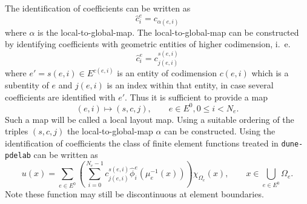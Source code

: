 The identification of coefficients can be written as
\begin{equation}
\hat{c}_i^e = c_{\alpha(e,i)}
\end{equation}
where $\alpha$ is the local-to-global-map.
The local-to-global-map can be constructed by identifying coefficients
with geometric entities of higher codimension, i.~e.
\begin{equation}
\hat{c}_i^e = c_{j(e,i)}^{s(e,i)}
\end{equation}
where $e'=s(e,i)\in E^{c(e,i)}$ is an entity of codimension $c(e,i)$
which is a subentity of $e$ and
$j(e,i)$ is an index within that entity, in case several
coefficients are identified with $e'$. Thus it is sufficient to
provide a map 
\begin{equation}
(e,i) \mapsto (s,c,j), \qquad e\in E^0, 0\leq i < N_e.
\end{equation}
Such a map will be called a local layout map. Using a suitable
ordering of the triples $(s,c,j)$ the local-to-global-map $\alpha$ can
be constructed. Using the identification of coefficients the class of
finite element functions treated in \texttt{dune-pdelab} can be
written as
\begin{equation}
u(x) = \sum_{e\in E^0} \left( \sum_{i=0}^{N_e-1} c_{j(e,i)}^{s(e,i)}
\hat\phi_i^e(\mu_e^{-1}(x)) \right) \chi_{\Omega_e}(x), 
\qquad x\in \bigcup_{e\in E^0} \Omega_e .
\end{equation}
Note these function may still be discontinuous at element boundaries. 
\newpage

\cite{BrennerScott}
